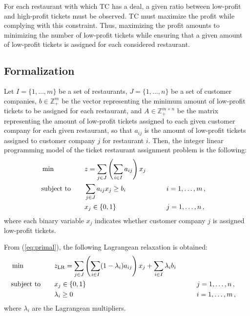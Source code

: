 \documentclass[runningheads]{llncs}
\begin{document}
For each restaurant with which TC has a deal, a given ratio between low-profit and high-profit tickets must be observed. 
TC must maximize the profit while complying with this constraint. Thus, maximizing the profit amounts to minimizing the number of low-profit tickets while ensuring that a given amount of low-profit tickets is assigned for each considered restaurant.

\subsection{Formalization}
\label{subsec:problem:formalization}

Let $I = \{1,\dots,m\}$ be a set of restaurants, $J = \{1,\dots,n\}$ be a set of customer companies, $b \in \mathbb{Z}_{+}^{m}$ be the vector representing the minimum amount of low-profit tickets to be assigned for each restaurant, and $A \in \mathbb{Z}_{+}^{m \times n}$ be the matrix representing the amount of low-profit tickets assigned to each given customer company for each given restaurant, so that $a_{ij}$ is the amount of low-profit tickets assigned to customer company $j$ for restaurant $i$. Then, the integer linear programming model of the ticket restaurant assignment problem is the following:
\begin{alignat}{3}
  &\min & \quad & z = \sum_{j \in J} \left( \sum_{i \in I} a_{ij} \right) x_j \label{eq:primal}\\
  &\text{subject to}  &       & \sum_{j \in J} a_{ij} x_j \ge b_i & \qquad & i = 1,\dots,m \, , \notag\\
  &                   &       & x_j \in \{0,1\}  &\qquad& j = 1,\dots,n \, , \notag
\end{alignat}
where each binary variable $x_j$ indicates whether customer company $j$ is assigned low-profit tickets.

From (\ref{eq:primal}), the following Lagrangean relaxation is obtained:
\begin{alignat}{3}
  &\min & \quad & z_{\text{LR}} = \sum_{j \in J} \left( \sum_{i \in I} (1 - \lambda_i) a_{ij} \right) x_j + \sum_{i \in I} \lambda_i b_i \label{eq:lagrangean}\\
  &\text{subject to}  &       & x_j \in \{0,1\} & \qquad & j = 1,\dots,n \, , \notag\\
  &                   &       & \lambda_i \ge 0  & \qquad & i = 1,\dots,m \, , \notag
\end{alignat}
where $\lambda_i$ are the Lagrangean multipliers.
\end{document}
